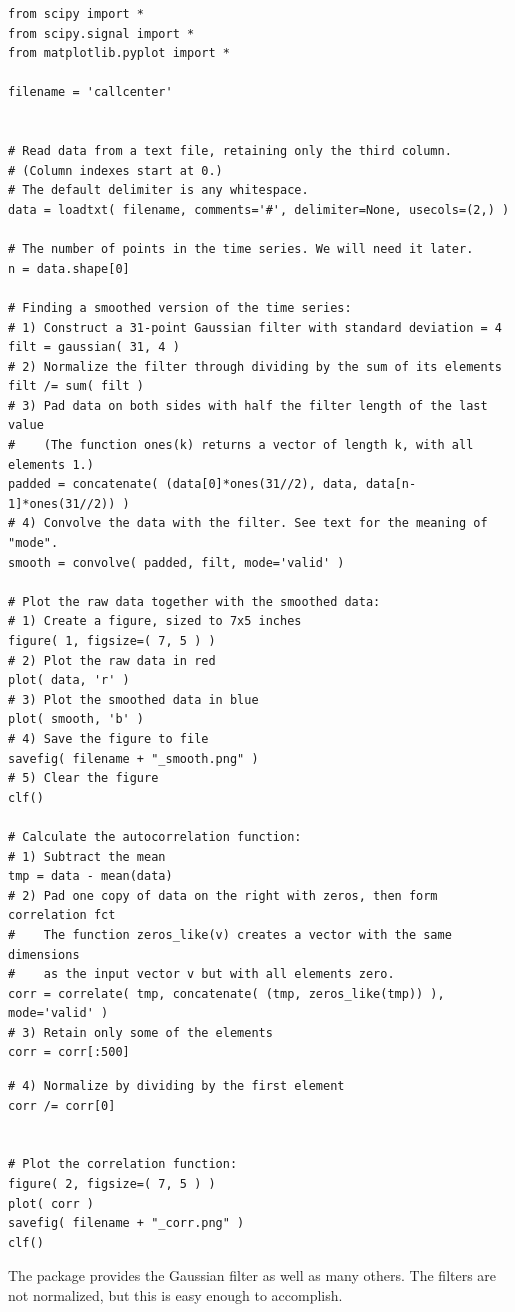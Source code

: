 \begin{verbatim}
from scipy import *
from scipy.signal import *
from matplotlib.pyplot import *

filename = 'callcenter'


# Read data from a text file, retaining only the third column.
# (Column indexes start at 0.)
# The default delimiter is any whitespace.
data = loadtxt( filename, comments='#', delimiter=None, usecols=(2,) )

# The number of points in the time series. We will need it later.
n = data.shape[0]

# Finding a smoothed version of the time series:
# 1) Construct a 31-point Gaussian filter with standard deviation = 4
filt = gaussian( 31, 4 )
# 2) Normalize the filter through dividing by the sum of its elements
filt /= sum( filt )
# 3) Pad data on both sides with half the filter length of the last value
#    (The function ones(k) returns a vector of length k, with all elements 1.)
padded = concatenate( (data[0]*ones(31//2), data, data[n-1]*ones(31//2)) )
# 4) Convolve the data with the filter. See text for the meaning of "mode".
smooth = convolve( padded, filt, mode='valid' )

# Plot the raw data together with the smoothed data:
# 1) Create a figure, sized to 7x5 inches
figure( 1, figsize=( 7, 5 ) )
# 2) Plot the raw data in red
plot( data, 'r' )
# 3) Plot the smoothed data in blue
plot( smooth, 'b' )
# 4) Save the figure to file
savefig( filename + "_smooth.png" )
# 5) Clear the figure
clf()

# Calculate the autocorrelation function:
# 1) Subtract the mean 
tmp = data - mean(data)
# 2) Pad one copy of data on the right with zeros, then form correlation fct
#    The function zeros_like(v) creates a vector with the same dimensions
#    as the input vector v but with all elements zero.
corr = correlate( tmp, concatenate( (tmp, zeros_like(tmp)) ), mode='valid' )
# 3) Retain only some of the elements
corr = corr[:500]
\end{verbatim}
\begin{verbatim}
# 4) Normalize by dividing by the first element
corr /= corr[0]


# Plot the correlation function:
figure( 2, figsize=( 7, 5 ) )
plot( corr )
savefig( filename + "_corr.png" )
clf()
\end{verbatim}

The package provides the Gaussian filter as well as many others.  The
filters are not normalized, but this is easy enough to accomplish.

